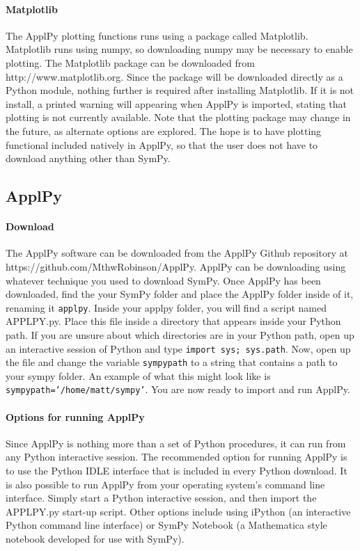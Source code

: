 \documentclass[11pt,epsfig,psfig,doublespace,singlespace]{article}
\begin{document}
\paragraph{Matplotlib} The ApplPy plotting functions runs using a package called Matplotlib. Matplotlib runs using numpy, so downloading numpy may be necessary to enable plotting. The Matplotlib package can be downloaded from http://www.matplotlib.org. Since the package will be downloaded directly as a Python module, nothing further is required after installing Matplotlib. If it is not install, a printed warning will appearing when ApplPy is imported, stating that plotting is not currently available. Note that the plotting package may change in the future, as alternate options are explored. The hope is to have plotting functional included natively in ApplPy, so that the user does not have to download anything other than SymPy.
\subsection{ApplPy}
\paragraph{Download} The ApplPy software can be downloaded from the ApplPy Github repository at https://github.com/MthwRobinson/ApplPy. ApplPy can be downloading using whatever technique you used to download SymPy. Once ApplPy has been downloaded, find the your SymPy folder and place the ApplPy folder inside of it, renaming it \texttt{applpy}. Inside your applpy folder, you will find a script named APPLPY.py. Place this file inside a directory that appears inside your Python path. If you are unsure about which directories are in your Python path, open up an interactive session of Python and type \texttt{import sys; sys.path}. Now, open up the file and change the variable \texttt{sympypath} to a string that contains a path to your sympy folder.  An example of what this might look like is \texttt{sympypath='/home/matt/sympy'}. You are now ready to import and run ApplPy.
\paragraph{Options for running ApplPy} Since ApplPy is nothing more than a set of Python procedures, it can run from any Python interactive session. The recommended option for running ApplPy is to use the Python IDLE interface that is included in every Python download. It is also possible to run ApplPy from your operating system's command line interface. Simply start a Python interactive session, and then import the APPLPY.py start-up script. Other options include using iPython (an interactive Python command line interface) or SymPy Notebook (a Mathematica style notebook developed for use with SymPy).
\end{document}
